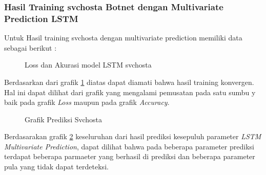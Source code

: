 \documentclass[./skripsi.tex]{subfiles}
\begin{document}
\subsubsection{Hasil Training svchosta Botnet dengan Multivariate Prediction LSTM}
\par Untuk Hasil training svchosta dengan multivariate prediction memiliki data sebagai berikut :

\begin{figure}[H]
    \caption{Loss dan Akurasi model LSTM svchosta}
    \label{fig:lstmm_svchosta}
\end{figure}

\par Berdasarkan dari grafik \ref{fig:lstmm_svchosta} diatas dapat diamati bahwa hasil training konvergen. Hal ini dapat dilihat dari grafik yang mengalami pemusatan pada satu sumbu y baik pada grafik \textit{Loss} maupun pada grafik \textit{Accuracy}.

\begin{figure}[H]
    \centering
    \caption{Grafik Prediksi Svchosta}
    \label{fig:lstmm_svchosta_pred}
\end{figure}

\par Berdasarakan grafik \ref{fig:lstmm_svchosta_pred} keseluruhan dari hasil prediksi kesepuluh parameter \textit{LSTM Multivariate Prediction}, dapat dilihat bahwa pada beberapa parameter prediksi terdapat beberapa parmaeter yang berhasil di prediksi dan beberapa parameter pula yang tidak dapat terdeteksi.
\end{document}
